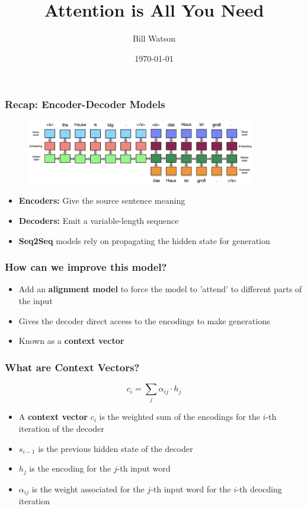 \documentclass[usenames,dvipsnames]{beamer}
\title{Attention is All You Need}
\author{Bill Watson}
\institute{S\&P Global}
\date{\today}
\begin{document}
\begin{frame}
\titlepage
\end{frame}


\begin{frame}
\frametitle{Recap: Encoder-Decoder Models}
\begin{figure}
  \centering
  \includegraphics[width=10cm, valign=c]{assets/enc-dec}
\end{figure}
\begin{itemize}
  \item \textbf{Encoders:} Give the source sentence meaning
  \item \textbf{Decoders:} Emit a variable-length sequence
  \item \textbf{Seq2Seq} models rely on propagating the hidden state for generation
\end{itemize}
\end{frame}

\begin{frame}
\frametitle{How can we improve this model?}
\begin{itemize}
  \item Add an \textbf{alignment model} to force the model to 'attend' to different parts of the input
  \item Gives the decoder direct access to the encodings to make generations
  \item Known as a \textbf{context vector}
\end{itemize}
\end{frame}

\begin{frame}
\frametitle{What are Context Vectors?}
\begin{equation*}
  c_i = \sum_{j} \alpha_{ij} \cdot h_j
\end{equation*}
\begin{itemize}
  \item A \textbf{context vector} $c_i$ is the weighted sum of the encodings for the $i$-th iteration of the decoder
  \item $s_{i-1}$ is the previous hidden state of the decoder
  \item $h_j$ is the encoding for the $j$-th input word
  \item $\alpha_{ij}$ is the weight associated for the $j$-th input word for the $i$-th deocding iteration
\end{itemize}
\end{frame}
\end{document}
